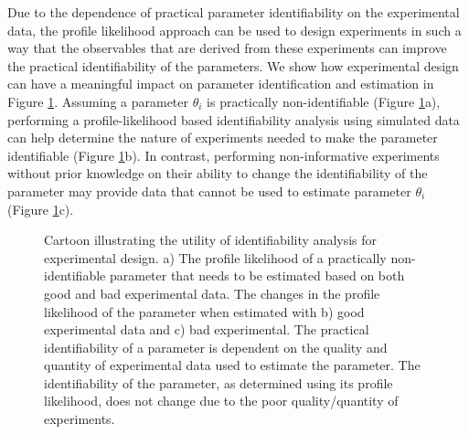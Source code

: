 \documentclass[10pt]{article}
\begin{document}
	Due to the dependence of practical parameter identifiability on the experimental data, the profile likelihood approach can be used to design experiments in such a way that the observables that are derived from these experiments can improve the practical identifiability of the parameters. We show how experimental design can have a meaningful impact on parameter identification and estimation in Figure \ref{fig:edwithpl}.	Assuming a parameter $\theta_i$ is practically non-identifiable (Figure \ref{fig:edwithpl}a), performing a profile-likelihood based identifiability analysis using simulated data can help determine the nature of experiments needed to make the parameter identifiable (Figure \ref{fig:edwithpl}b). In contrast, performing non-informative experiments without prior knowledge on their ability to change the identifiability of the parameter may provide data that cannot be used to estimate parameter $\theta_i$ (Figure \ref{fig:edwithpl}c).
	 
	\begin{figure}[!tbhp]
		\caption{Cartoon illustrating the utility of identifiability analysis for experimental design. a) The profile likelihood of a practically non-identifiable parameter that needs to be estimated based on both good and bad experimental data. The changes in the profile likelihood of the parameter when estimated with b) good experimental data and c) bad experimental. The practical identifiability of a parameter is dependent on the quality and quantity of experimental data used to estimate the parameter. The identifiability of the parameter, as determined using its profile likelihood, does not change due to the poor quality/quantity of experiments.}\label{fig:edwithpl}
	\end{figure}	
	
\end{document}
